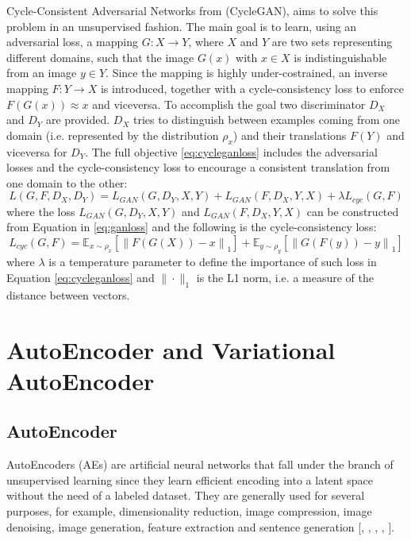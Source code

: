 Cycle-Consistent Adversarial Networks from \citet{CycleGAN2017} (CycleGAN), aims to solve this problem in an unsupervised fashion. The main goal is to learn, using an adversarial loss, a mapping $G:X\rightarrow Y$, where $X$ and $Y$ are two sets representing different domains, such that the image $G(x) $ with $x\in X$ is indistinguishable from an image $y\in Y$. Since the mapping is highly under-costrained, an inverse mapping $F:Y \rightarrow X$ is introduced, together with a cycle-consistency loss to enforce $F(G(x)) \approx x$ and viceversa.
To accomplish the goal two discriminator $D_{X}$ and $D_{Y}$ are provided. $D_{X}$ tries to distinguish between examples coming from one domain (i.e. represented by the distribution $\rho_{x}$) and their translations $F(Y)$ and viceversa for $D_{Y}$. 
The full objective \ref{eq:cycleganloss} includes the adversarial losses and the cycle-consistency loss to encourage a consistent translation from one domain to the other:
\begin{equation}
  \label{eq:cycleganloss}
  L(G,F,D_{X}, D_{Y}) = L_{GAN}(G, D_{Y},X,Y) + L_{GAN}(F, D_{X},Y,X) + \lambda L_{cyc}(G,F)
\end{equation}
where the loss $L_{GAN}(G, D_{Y},X,Y)$ and $L_{GAN}(F, D_{X},Y,X)$ can be constructed from Equation in \ref{eq:ganloss}
and the following is the cycle-consistency loss:
\begin{equation}
  L_{cyc}(G,F) =  \mathbb{E}_{x\sim \rho_{x}}[\left \| F(G(X))-x \right \|_1] + \mathbb{E}_{y\sim \rho_{y}}[\left \| G(F(y))-y \right \|_1]
\end{equation}
where $\lambda$ is a temperature parameter to define the importance of such loss in Equation \ref{eq:cycleganloss} and $\| \cdot \|_1$ is the L1 norm, i.e. a measure of the distance between vectors.

\section{AutoEncoder and Variational AutoEncoder}

\subsection{AutoEncoder}
AutoEncoders (AEs) are artificial neural networks that fall under the branch of unsupervised learning since they learn efficient encoding into a latent space without the need of a labeled dataset. They are generally used for several purposes, for example, dimensionality reduction, image compression, image denoising, image generation, feature extraction and sentence generation [\citet{doi:10.1126/science.1127647}, \citet{8456308}, \citet{7836672}, \citet{7926714}, \citet{8852155}]. 

